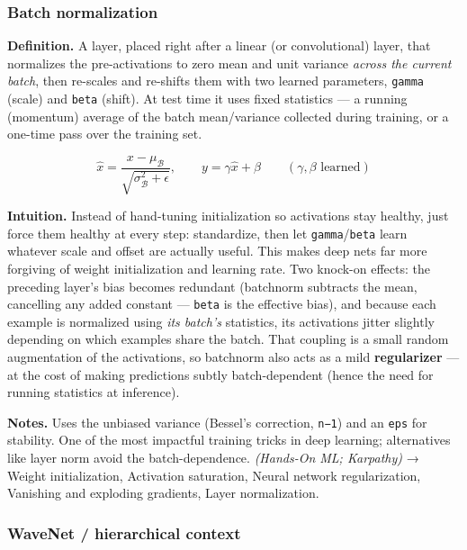 \documentclass[
  10pt,
  letterpaper,
  onecolumn]{article}
\begin{document}
\hypertarget{batch-normalization}{%
\subsubsection{Batch normalization}\label{batch-normalization}}

\textbf{Definition.} A layer, placed right after a linear (or
convolutional) layer, that normalizes the pre-activations to zero mean
and unit variance \emph{across the current batch}, then re-scales and
re-shifts them with two learned parameters, \texttt{gamma} (scale) and
\texttt{beta} (shift). At test time it uses fixed statistics --- a
running (momentum) average of the batch mean/variance collected during
training, or a one-time pass over the training set.

\begin{equation*}
\hat x=\frac{x-\mu_{\mathcal B}}{\sqrt{\sigma^2_{\mathcal B}+\epsilon}},
\qquad
y=\gamma\hat x+\beta
\qquad (\gamma,\beta\text{ learned})
\end{equation*}

\textbf{Intuition.} Instead of hand-tuning initialization so activations
stay healthy, just force them healthy at every step: standardize, then
let \texttt{gamma}/\texttt{beta} learn whatever scale and offset are
actually useful. This makes deep nets far more forgiving of weight
initialization and learning rate. Two knock-on effects: the preceding
layer's bias becomes redundant (batchnorm subtracts the mean, cancelling
any added constant --- \texttt{beta} is the effective bias), and because
each example is normalized using \emph{its batch's} statistics, its
activations jitter slightly depending on which examples share the batch.
That coupling is a small random augmentation of the activations, so
batchnorm also acts as a mild \textbf{regularizer} --- at the cost of
making predictions subtly batch-dependent (hence the need for running
statistics at inference).

\textbf{Notes.} Uses the unbiased variance (Bessel's correction,
\texttt{n−1}) and an \texttt{eps} for stability. One of the most
impactful training tricks in deep learning; alternatives like layer norm
avoid the batch-dependence. \emph{(Hands-On ML; Karpathy)} → Weight
initialization, Activation saturation, Neural network regularization,
Vanishing and exploding gradients, Layer normalization.

\hypertarget{wavenet-hierarchical-context}{%
\subsubsection{WaveNet / hierarchical
context}\label{wavenet-hierarchical-context}}
\end{document}
